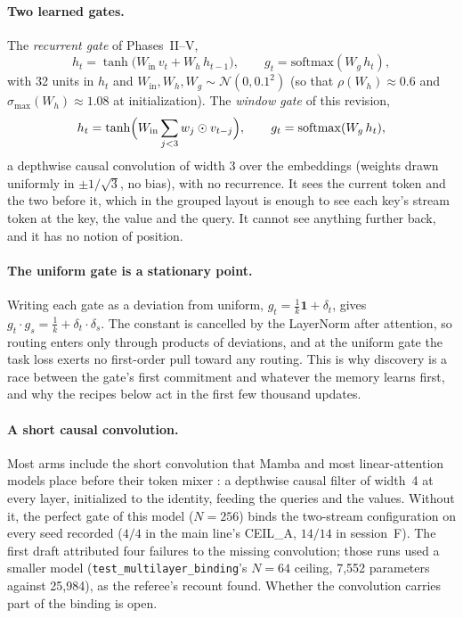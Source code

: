 \documentclass[11pt]{article}
\newcommand{\arm}[1]{\textsf{#1}}
\begin{document}
\paragraph{Two learned gates.} The \emph{recurrent gate} of Phases~II--V,
\begin{equation}
h_t = \tanh\bigl(W_{\mathrm{in}}\,v_t + W_h\,h_{t-1}\bigr), \qquad g_t = \mathrm{softmax}(W_g\,h_t),
\label{eq:gate}
\end{equation}
with 32 units in $h_t$ and $W_{\mathrm{in}}, W_h, W_g \sim \mathcal{N}(0, 0.1^2)$ (so that $\rho(W_h) \approx 0.6$ and $\sigma_{\max}(W_h) \approx 1.08$ at initialization). The \emph{window gate} of this revision,
\begin{equation}
h_t = \tanh\Bigl(W_{\mathrm{in}} \sum_{j<3} w_j \odot v_{t-j}\Bigr), \qquad g_t = \mathrm{softmax}(W_g\,h_t),
\label{eq:window}
\end{equation}
a depthwise causal convolution of width 3 over the embeddings (weights drawn uniformly in $\pm 1/\sqrt{3}$, no bias), with no recurrence. It sees the current token and the two before it, which in the grouped layout is enough to see each key's stream token at the key, the value and the query. It cannot see anything further back, and it has no notion of position.

\paragraph{The uniform gate is a stationary point.} Writing each gate as a deviation from uniform, $g_t = \tfrac{1}{k}\mathbf{1} + \delta_t$, gives $g_t \cdot g_s = \tfrac{1}{k} + \delta_t \cdot \delta_s$. The constant is cancelled by the LayerNorm after attention, so routing enters only through products of deviations, and at the uniform gate the task loss exerts no first-order pull toward any routing. This is why discovery is a race between the gate's first commitment and whatever the memory learns first, and why the recipes below act in the first few thousand updates.

\paragraph{A short causal convolution.} Most arms include the short convolution that Mamba and most linear-attention models place before their token mixer \cite{mamba}: a depthwise causal filter of width~4 at every layer, initialized to the identity, feeding the queries and the values. Without it, the perfect gate of this model ($N = 256$) binds the two-stream configuration on every seed recorded ($4/4$ in the main line's \arm{CEIL\_A}, $14/14$ in session~F). The first draft attributed four failures to the missing convolution; those runs used a smaller model (\texttt{test\_multilayer\_binding}'s $N = 64$ ceiling, 7{,}552 parameters against 25{,}984), as the referee's recount found. Whether the convolution carries part of the binding is open.
\end{document}
